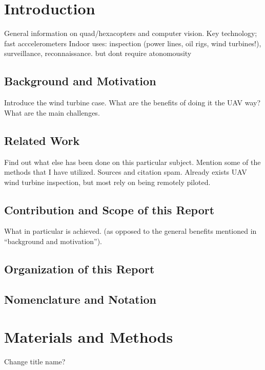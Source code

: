 \documentclass[a4paper,10pt]{article}
\title{}
\author{}
\begin{document}
\maketitle

\begin{abstract}
\end{abstract}

\tableofcontents


\section{Introduction}

General information on quad/hexacopters and computer vision.
Key technology; fast acccelerometers
Indoor
uses: inspection (power lines, oil rigs, wind turbines!), surveillance, reconnaissance. but dont require atonomousity

  \subsection{Background and Motivation}
  
  
  Introduce the wind turbine case. What are the benefits of doing it the UAV way? What are the main challenges.
  \subsection{Related Work}
  Find out what else has been done on this particular subject. Mention some of the methods that I have utilized. Sources and citation spam.
  Already exists UAV wind turbine inspection, but most rely on being remotely piloted.
  \subsection{Contribution and Scope of this Report}
  What in particular is achieved. (as opposed to the general benefits mentioned in ``background and motivation'').
  \subsection{Organization of this Report}
  
  \subsection{Nomenclature and Notation}
  
  
\section{Materials and Methods}
Change title name?
\end{document}
